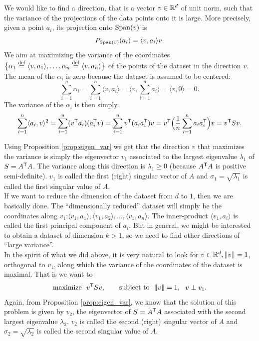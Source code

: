 \documentclass[11pt,nocut]{article}
\begin{document}
We would like to find a direction, that is a vector $v \in \mathbb{R}^d$ of unit norm, such that the variance of the projections of the data points onto it is large. More precisely, given a point $a_i$, its projection onto ${{\rm Span}}(v)$ is
$$
P_{{{\rm Span}}(v)}(a_i) = 
\langle v, a_i \rangle v.
$$
We aim at maximizing the variance of the coordinates $\big\{ \alpha_1 \overset{\rm def}{=} \langle v, a_1 \rangle, \dots , \alpha_n \overset{\rm def}{=} \langle v, a_n \rangle \big\}$ of the points of the dataset in the direction $v$. 
The mean of the $\alpha_i$ is zero because the dataset is assumed to be centered:
$$
\sum_{i=1}^n \alpha_i 
=
\sum_{i=1}^n \langle v, a_i \rangle
= \Big\langle v, \sum_{i=1}^n a_i \Big\rangle = \langle v,0 \rangle = 0.
$$
The variance of the $\alpha_i$ is then simply
$$
\sum_{i=1}^n \langle a_i, v \rangle^2
=
\sum_{i=1}^n (v^{{\sf T}}a_i)(a_i^{{\sf T}} v)
=
\sum_{i=1}^n v^{{\sf T}} (a_i a_i^{{\sf T}}) v
=
v^{{\sf T}} \Big(\frac{1}{n}\sum_{i=1}^n a_i a_i^{{\sf T}}\Big) v
= v^{{\sf T}} S v.
$$

Using Proposition \ref{prop:eigen_var} we get that the direction $v$ that maximizes the variance is simply the eigenvector $v_1$ associated to the largest eigenvalue $\lambda_1$ of $S = A^{{\sf T}}A$. The variance along this direction is $\lambda_1 \geq 0$ (because $A^{{\sf T}}A$ is positive semi-definite).
$v_1$ is called the first (right) singular vector of $A$ and $\sigma_1 = \sqrt{\lambda_1}$ is called the first singular value of $A$.
\\

If we want to reduce the dimension of the dataset from $d$ to $1$, then we are basically done. The ``dimensionally reduced'' dataset will simply be the coordinates along $v_1$:$\langle v_1, a_1 \rangle, \langle v_1, a_2 \rangle, \dots, \langle v_1, a_n \rangle$.
The inner-product $\langle v_1, a_i \rangle$ is called the first principal component of $a_i$.
But in general, we might be interested to obtain a dataset of dimension $k >1$, so we need to find other directions of ``large variance''.
\\

In the spirit of what we did above, it is very natural to look for $v \in \mathbb{R}^d, \|v\| = 1$, orthogonal to $v_1$, along which the variance of the coordinates of the dataset is maximal.
That is we want to 
$$
\text{maximize} \ \ v^{\sT} S v, \qquad \text{subject to} \ \ \|v\| = 1, \ \ v \perp v_1.
$$
Again, from Proposition \ref{prop:eigen_var}, we know that the solution of this problem is given by $v_2$, the eigenvector of $S = A^{{\sf T}}A$ associated with the second largest eigenvalue $\lambda_2$.
$v_2$ is called the second (right) singular vector of $A$ and $\sigma_2 = \sqrt{\lambda_2}$ is called the second singular value of $A$.
\\
\end{document}
